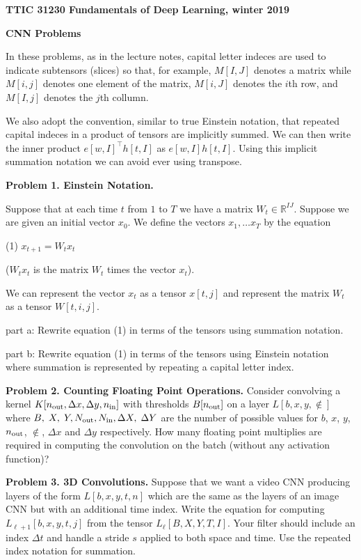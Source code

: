 \documentclass{article}
\newcommand{\solution}[1]{}
\begin{document}
\centerline{\bf TTIC 31230 Fundamentals of Deep Learning, winter 2019}

\medskip
\centerline{\bf CNN Problems}

In these problems, as in the lecture notes, capital letter indeces are used to indicate subtensors (slices) so that, for example,  $M[I,J]$ denotes a matrix
while $M[i,j]$ denotes one element of the matrix, $M[i,J]$ denotes the $i$th row, and $M[I,j]$ denotes the $j$th collumn.

\medskip
We also adopt the convention, similar to true Einstein notation, that repeated capital indeces in a product of tensors are implicitly summed.  We can then write
the inner product $e[w,I]^\top h[t,I]$ as $e[w,I]h[t,I]$.  Using this implicit summation notation we can avoid ever using transpose.

\medskip
{\bf Problem 1. Einstein Notation.}

Suppose that at each time $t$ from $1$ to $T$ we have a matrix $W_t \in \mathbb{R}^{IJ}$.  Suppose we are given an initial vector $x_0$.  We define the vectors $x_1,\ldots x_T$ by the equation

(1)  $x_{t+1} = W_t x_t$

($W_t x_t$ is the matrix $W_t$ times the vector $x_t$).

We can represent the vector $x_t$ as a tensor $x[t,j]$ and represent the matrix $W_t$ as a tensor $W[t,i,j]$.

\medskip
part a: Rewrite equation (1) in terms of the tensors using summation notation.

\medskip
part b: Rewrite equation (1) in terms of the tensors using Einstein notation where summation is represented by repeating a capital letter index.

\bigskip
{\bf Problem 2. Counting Floating Point Operations.}  Consider convolving a kernel $K[n_{\mathrm{out}},\Delta x, \Delta y,n_{\mathrm{in}}]$  with thresholds $B[n_{\mathrm{out}}]$ on a layer $L[b,x,y,\nin]$ where $B,\;X,\;Y,N_{\mathrm{out}}, N_{\mathrm{in}},\Delta X,\;\Delta Y$
are the number of possible values for $b$, $x$, $y$, $n_{\mathrm{out}}$, $\nin$, $\Delta x$ and $\Delta y$ respectively.
How many floating point multiplies are required
in computing the convolution on the batch (without any activation function)?

\solution{$$BXY\;\Delta X\;\Delta Y \;\Nout \;\Nin$$}

\bigskip
{\bf Problem 3. 3D Convolutions.} Suppose that we want a video CNN producing
layers of the form $L[b,x,y,t,n]$ which are the same as the layers of an image CNN but with an additional time index.
Write the equation for computing $L_{\ell+1}[b,x,y,t,j]$ from the tensor $L_\ell[B,X,Y,T,I]$.  Your filter should include an index $\Delta t$ and handle a stride $s$ applied
to both space and time. Use the repeated index notation for summation.
\end{document}
